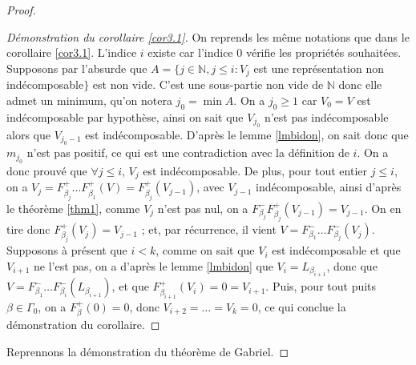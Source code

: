 \documentclass[a4paper,11pt]{article}
\begin{document}
\begin{proof}
	\begin{proof}[Démonstration du corollaire \ref{cor3.1}]
		On reprends les même notations que dans le corollaire \ref{cor3.1}. L'indice $i$ existe car l'indice $0$ vérifie les propriétés souhaitées. Supposons par l'absurde que $A=\{j\in\mathbb N, j\leq i : V_j$ est une représentation non indécomposable$\}$ est non vide. C'est une sous-partie non vide de $\mathbb N$ donc elle admet un minimum, qu'on notera $j_0=\min A$. On a $j_0\geq 1$ car $V_0=V$ est indécomposable par hypothèse, ainsi on sait que $V_{j_0}$ n'est pas indécomposable alors que $V_{j_0-1}$ est indécomposable. D'après le lemme \ref{lmbidon}, on sait donc que $m_{j_0}$ n'est pas positif, ce qui est une contradiction avec la définition de $i$. On a donc prouvé que $\forall j\leq i$, $V_j$ est indécomposable. De plus, pour tout entier $j\leq i$, on a $V_j=F_{\beta_j}^+\dots F_{\beta_1}^+(V)=F_{\beta_j}^+(V_{j-1})$, avec $V_{j-1}$ indécomposable, ainsi d'après le théorème \ref{thm1}, comme $V_j$ n'est pas nul, on a $F_{\beta_j}^-F_{\beta_j}^+(V_{j-1})=V_{j-1}$. On en tire donc $F_{\beta_j}^+(V_j)=V_{j-1}$ ; et, par récurrence, il vient $V=F_{\beta_1}^-\dots F_{\beta_j}^-(V_j)$. Supposons à présent que $i<k$, comme on sait que $V_i$ est indécomposable et que $V_{i+1}$ ne l'est pas, on a d'après le lemme \ref{lmbidon} que $V_i=L_{\beta_{i+1}}$, donc que $V=F_{\beta_1}^-\dots F_{\beta_i}^-(L_{\beta_{i+1}})$, et que $F_{\beta_{i+1}}^+(V_i)=0=V_{i+1}$. Puis, pour tout puits $\beta\in\Gamma_0$, on a $F_\beta^+(0)=0$, donc $V_{i+2}=\dots=V_k=0$, ce qui conclue la démonstration du corollaire.
	\end{proof}
	Reprennons la démonstration du théorème de Gabriel.
\end{proof}
\clearpage


\end{document}
